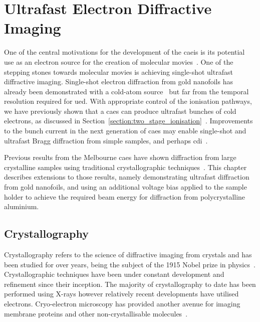 \chapter{Ultrafast Electron Diffractive Imaging}\label{chapter:diffraction}

One of the central motivations for the development of the \gls{caeis} is its potential use as an electron source for the creation of molecular movies~\cite{van_der_geer_ultracold_2009}.
One of the stepping stones towards molecular movies is achieving single-shot ultrafast diffractive imaging.
Single-shot electron diffraction from gold nanofoils has already been demonstrated with a cold-atom source~\cite{speirs_single-shot_2015} but far from the temporal resolution required for \gls{ued}.
With appropriate control of the ionisation pathways, we have previously shown that a \gls{caes} can produce ultrafast bunches of cold electrons, as discussed in Section~\ref{section:two_stage_ionisation}~\cite{speirs_single-shot_2015,speirs_identification_2017,speirs_electron_2017}.
Improvements to the bunch current in the next generation of \gls{caes} may enable single-shot and ultrafast Bragg diffraction from simple samples, and perhaps \gls{cdi}~\cite{mcculloch_cold_2016}.

Previous results from the Melbourne \gls{caes} have shown diffraction from large crystalline samples using traditional crystallographic techniques~\cite{speirs_single-shot_2015,speirs_electron_2017}.
This chapter describes extensions to those results, namely demonstrating ultrafast diffraction from gold nanofoils, and using an additional voltage bias applied to the sample holder to achieve the required beam energy for diffraction from polycrystalline aluminium.

\section{Crystallography}

Crystallography refers to the science of diffractive imaging from crystals and has been studied for over \unit[100]{years}, being the subject of the 1915 Nobel prize in physics~\cite{bragg_structure_1913}.
Crystallographic techniques have been under constant development and refinement since their inception.
The majority of crystallography to date has been performed using X-rays however relatively recent developments have utilised electrons.
Cryo-electron microscopy has provided another avenue for imaging membrane proteins and other non-crystallisable molecules~\cite{zeitler_cryo_1982,cowley_electron_1992}.

